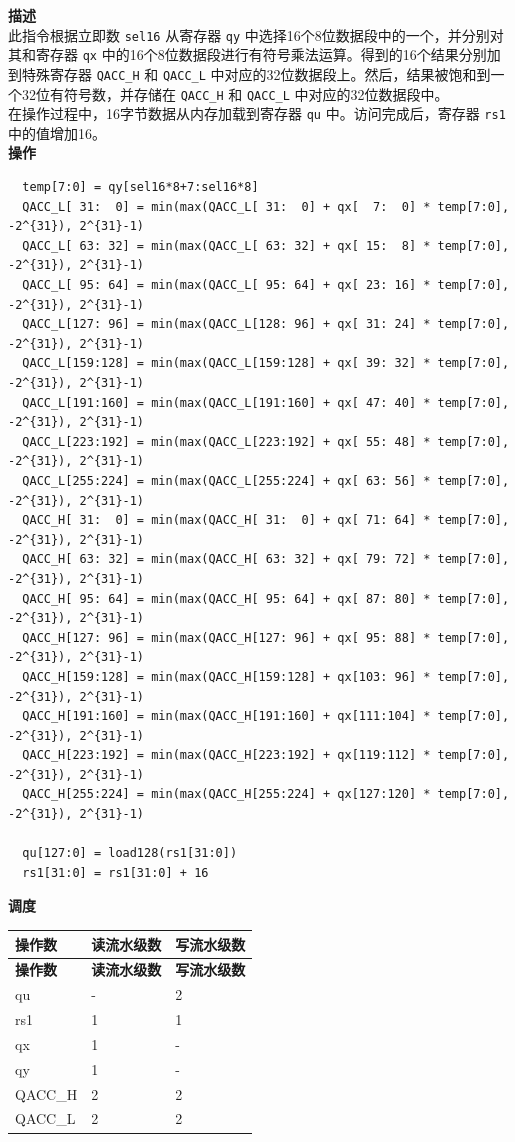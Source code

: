 \textbf{描述}\\
此指令根据立即数 \lstinline{sel16} 从寄存器 \lstinline{qy} 中选择16个8位数据段中的一个，并分别对其和寄存器 \lstinline{qx} 中的16个8位数据段进行有符号乘法运算。得到的16个结果分别加到特殊寄存器 \lstinline{QACC_H} 和 \lstinline{QACC_L} 中对应的32位数据段上。然后，结果被饱和到一个32位有符号数，并存储在 \lstinline{QACC_H} 和 \lstinline{QACC_L} 中对应的32位数据段中。\\
在操作过程中，16字节数据从内存加载到寄存器 \lstinline{qu} 中。访问完成后，寄存器 \lstinline{rs1} 中的值增加16。\\
\textbf{操作}
\begin{lstlisting}
  temp[7:0] = qy[sel16*8+7:sel16*8]
  QACC_L[ 31:  0] = min(max(QACC_L[ 31:  0] + qx[  7:  0] * temp[7:0], -2^{31}), 2^{31}-1)
  QACC_L[ 63: 32] = min(max(QACC_L[ 63: 32] + qx[ 15:  8] * temp[7:0], -2^{31}), 2^{31}-1)
  QACC_L[ 95: 64] = min(max(QACC_L[ 95: 64] + qx[ 23: 16] * temp[7:0], -2^{31}), 2^{31}-1)
  QACC_L[127: 96] = min(max(QACC_L[128: 96] + qx[ 31: 24] * temp[7:0], -2^{31}), 2^{31}-1)
  QACC_L[159:128] = min(max(QACC_L[159:128] + qx[ 39: 32] * temp[7:0], -2^{31}), 2^{31}-1)
  QACC_L[191:160] = min(max(QACC_L[191:160] + qx[ 47: 40] * temp[7:0], -2^{31}), 2^{31}-1)
  QACC_L[223:192] = min(max(QACC_L[223:192] + qx[ 55: 48] * temp[7:0], -2^{31}), 2^{31}-1)
  QACC_L[255:224] = min(max(QACC_L[255:224] + qx[ 63: 56] * temp[7:0], -2^{31}), 2^{31}-1)
  QACC_H[ 31:  0] = min(max(QACC_H[ 31:  0] + qx[ 71: 64] * temp[7:0], -2^{31}), 2^{31}-1)
  QACC_H[ 63: 32] = min(max(QACC_H[ 63: 32] + qx[ 79: 72] * temp[7:0], -2^{31}), 2^{31}-1)
  QACC_H[ 95: 64] = min(max(QACC_H[ 95: 64] + qx[ 87: 80] * temp[7:0], -2^{31}), 2^{31}-1)
  QACC_H[127: 96] = min(max(QACC_H[127: 96] + qx[ 95: 88] * temp[7:0], -2^{31}), 2^{31}-1)
  QACC_H[159:128] = min(max(QACC_H[159:128] + qx[103: 96] * temp[7:0], -2^{31}), 2^{31}-1)
  QACC_H[191:160] = min(max(QACC_H[191:160] + qx[111:104] * temp[7:0], -2^{31}), 2^{31}-1)
  QACC_H[223:192] = min(max(QACC_H[223:192] + qx[119:112] * temp[7:0], -2^{31}), 2^{31}-1)
  QACC_H[255:224] = min(max(QACC_H[255:224] + qx[127:120] * temp[7:0], -2^{31}), 2^{31}-1)

  qu[127:0] = load128(rs1[31:0])
  rs1[31:0] = rs1[31:0] + 16
\end{lstlisting}

\textbf{调度}\\
\begin{longtable}[c]{|l|l|l|}
    \hline
    \rowcolor{lightgray}
    \textbf{操作数} & \textbf{读流水级数} & \textbf{写流水级数} \\\hline
    \endfirsthead
    \hline
    \rowcolor{lightgray}
     \textbf{操作数} & \textbf{读流水级数} & \textbf{写流水级数} \\\hline
    \endhead
    \hline
    \endfoot

    qu & - & 2 \\\hline
    rs1 & 1 & 1 \\\hline
     qx & 1 & - \\\hline
     qy & 1 & - \\\hline
     QACC\_H & 2 & 2 \\\hline
     QACC\_L & 2 & 2

\end{longtable}

